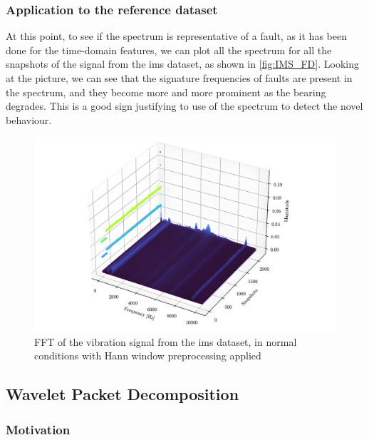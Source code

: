 \subsubsection{Application to the reference dataset}

At this point, to see if the spectrum is representative of a fault, as it has been done for the time-domain features, we can plot all the spectrum for all the snapshots of the  signal from the \gls{ims} dataset, as shown in \autoref{fig:IMS_FD}. Looking at the picture, we can see that the signature frequencies of faults are present in the spectrum, and they become more and more prominent as the bearing degrades. This is a good sign justifying to use of the spectrum to detect the novel behaviour.

\begin{figure}
    \centering
    \includegraphics[width=\textwidth]{images/FeatureExtraction/FD_IMS.png}
    \caption{FFT of the  vibration signal from the \gls{ims} dataset, in normal conditions with Hann window preprocessing
    applied}
    \label{fig:IMS_FD}
\end{figure}


\subsection{Wavelet Packet Decomposition}
\label{sec:WPD}

\subsubsection{Motivation}

